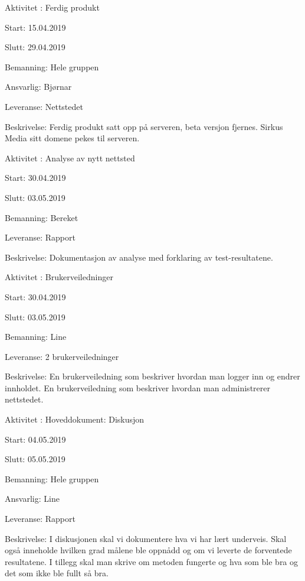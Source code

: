 \documentclass[11pt,a4paper]{report}
\begin{document}
\begin{compactdesc}
	\item [Aktivitet \arabic{aktivitetTeller}:] Ferdig produkt
	\begin{compactitem}
	\item Start: 15.04.2019
	\item Slutt: 29.04.2019
	\item Bemanning: Hele gruppen
	\item Ansvarlig: Bjørnar
	\item Leveranse: Nettstedet
	\item Beskrivelse: Ferdig produkt satt opp på serveren, beta versjon fjernes. Sirkus Media sitt domene pekes til serveren.
	\addtocounter{aktivitetTeller}{1}
	\end{compactitem}
	
	\item [Aktivitet \arabic{aktivitetTeller}:] Analyse av nytt nettsted
	\begin{compactitem}
	\item Start: 30.04.2019
	\item Slutt: 03.05.2019
	\item Bemanning: Bereket
	\item Leveranse: Rapport
	\item Beskrivelse: Dokumentasjon av analyse med forklaring av test-resultatene.
	\addtocounter{aktivitetTeller}{1}
	\end{compactitem}
	
	\item [Aktivitet \arabic{aktivitetTeller}:] Brukerveiledninger
	\begin{compactitem}
	\item Start: 30.04.2019
	\item Slutt: 03.05.2019
	\item Bemanning: Line
	\item Leveranse: 2 brukerveiledninger
	\item Beskrivelse: En brukerveiledning som beskriver hvordan man logger inn og endrer innholdet. En brukerveiledning som beskriver hvordan man administrerer nettstedet.
	\addtocounter{aktivitetTeller}{1}
	\end{compactitem}
	
	\item [Aktivitet \arabic{aktivitetTeller}:] Hoveddokument: Diskusjon
	\begin{compactitem}
	\item Start: 04.05.2019
	\item Slutt: 05.05.2019
	\item Bemanning: Hele gruppen
	\item Ansvarlig: Line
	\item Leveranse: Rapport
	\item Beskrivelse: I diskusjonen skal vi dokumentere hva vi har lært underveis. Skal også inneholde hvilken grad målene ble oppnådd og om vi leverte de forventede resultatene. I tillegg skal man skrive om metoden fungerte og hva som ble bra og det som ikke ble fullt så bra. 
	\addtocounter{aktivitetTeller}{1}
	\end{compactitem}
	

\end{compactdesc}
\end{document}
